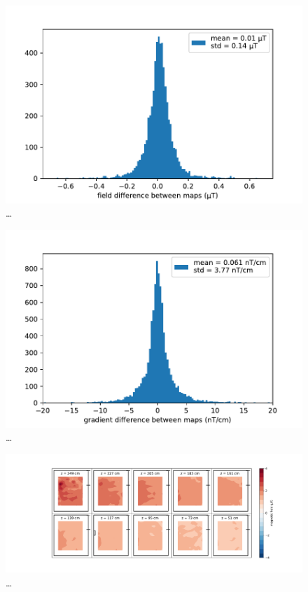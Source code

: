 \begin{figure}
  \centering
  \includegraphics[width=0.9\linewidth]{gfx/mapping/lpsc/reproducibility_field.pdf}
  \caption{\ldots}
  \label{fig:mapping_bastille_magnitude}
\end{figure}

\begin{figure}
  \centering
  \includegraphics[width=0.9\linewidth]{gfx/mapping/lpsc/reproducibility_gradient.pdf}
  \caption{\ldots}
  \label{fig:mapping_bastille_magnitude}
\end{figure}

\begin{figure}
  \centering
  \includegraphics[width=0.9\linewidth]{gfx/mapping/lpsc/bastille_crane_change_magnitude.pdf}
  \caption{\ldots}
  \label{fig:mapping_bastille_magnitude}
\end{figure}



